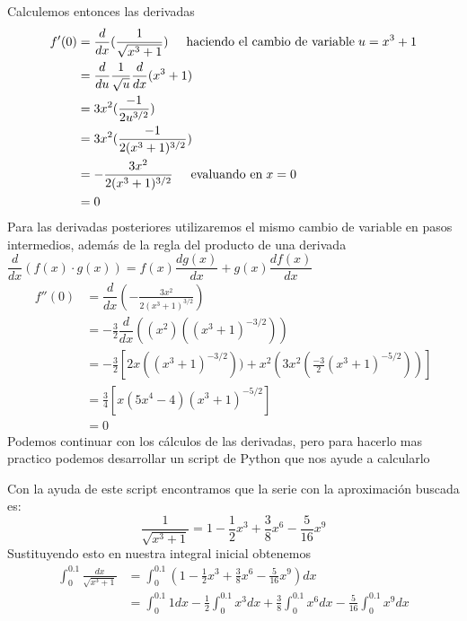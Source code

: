         Calculemos entonces las derivadas
        \begin{align*}
            f'(0) & = \dfrac{d}{dx}(\frac{1}{\sqrt{x^3 + 1}})\hspace{0.5 cm} \text{haciendo el cambio de variable} \hspace{0.1 cm} u = x^3 + 1 \\
            & = \dfrac{d}{du}\frac{1}{\sqrt{u}} \dfrac{d}{dx}(x^3 + 1) \\
            & = 3x^2(\frac{-1}{2u^{3/2}}) \\
            & = 3x^2(\frac{-1}{2(x^3 + 1)^{3/2}}) \\
            & = - \frac{3x^2}{2(x^3 + 1)^{3/2}} \hspace{0.5 cm} \text{evaluando en} \hspace{0.1 cm} x = 0 \\
            & = 0
        \end{align*}
        Para las derivadas posteriores utilizaremos el mismo cambio de variable en pasos intermedios, además de la regla del producto de una derivada
        $\dfrac{d}{dx}(f(x)\cdot g(x)) = f(x) \dfrac{d g(x)}{dx} + g(x)\dfrac{d f(x)}{dx}$
        \begin{align*}
            f''(0) & = \dfrac{d}{dx}(- \frac{3x^2}{2(x^3 + 1)^{3/2}}) \\
            & = -\frac{3}{2} \dfrac{d}{dx}((x^2)((x^3 + 1)^{-3/2})) \\
            & = -\frac{3}{2} \left[2x((x^3 + 1)^{-3/2})) + x^2(3x^2(\frac{-3}{2}(x^3 + 1)^{-5/2}))\right] \\
            & = \frac{3}{4}\left[x(5x^4 - 4)(x^3 + 1)^{-5/2}\right] \\
            & = 0
        \end{align*}
        Podemos continuar con los cálculos de las derivadas, pero para hacerlo mas practico podemos desarrollar un script de Python que nos ayude
        a calcularlo
        
        Con la ayuda de este script encontramos que la serie con la aproximación buscada es:
        \begin{equation}
            \frac{1}{\sqrt{x^3 + 1}} =   1 - \frac{1}{2}x^3 + \frac{3}{8}x^6 - \frac{5}{16}x^9
        \end{equation}
        Sustituyendo esto en nuestra integral inicial obtenemos
        \begin{align*}
            \int_0^{0.1} \frac{dx}{\sqrt{x^3 + 1}} & =  \int_0^{0.1} \left(1 - \frac{1}{2}x^3 + \frac{3}{8}x^6 - \frac{5}{16}x^9\right)  dx\\
            & =   \int_0^{0.1} 1 dx -  \frac{1}{2} \int_0^{0.1} x^3 dx + \frac{3}{8} \int_0^{0.1} x^6 dx - \frac{5}{16} \int_0^{0.1} x^9 dx \\
        \end{align*}

